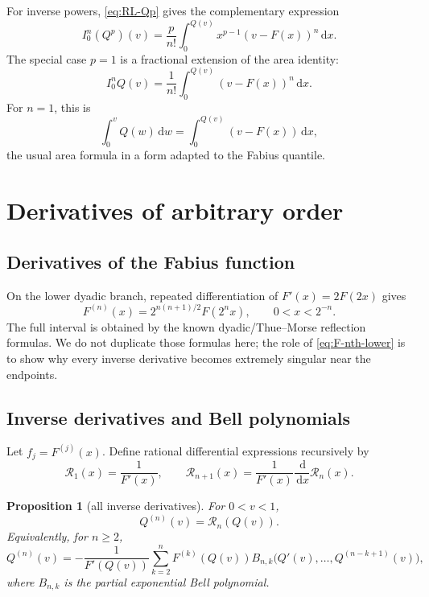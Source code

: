 \documentclass[11pt,oneside]{article}
\newtheorem{proposition}[theorem]{Proposition}
\theoremstyle{definition}
\newcommand{\F}{F}
\newcommand{\Q}{Q}
\newcommand{\dd}{\,\mathrm d}
\begin{document}
For inverse powers, \cref{eq:RL-Qp} gives the complementary expression
\begin{equation}\label{eq:nth-Q-primitive}
 I_0^n(\Q^p)(v)
 =\frac{p}{n!}\int_0^{\Q(v)}x^{p-1}(v-\F(x))^n\dd x.
\end{equation}
The special case \(p=1\) is a fractional extension of the area identity:
\begin{equation}\label{eq:nth-Q-area}
 I_0^n\Q(v)=\frac1{n!}\int_0^{\Q(v)}(v-\F(x))^n\dd x.
\end{equation}
For \(n=1\), this is
\begin{equation}\label{eq:classic-inverse-area}
 \int_0^v\Q(w)\dd w=\int_0^{\Q(v)}(v-\F(x))\dd x,
\end{equation}
the usual area formula in a form adapted to the Fabius quantile.

\section{Derivatives of arbitrary order}

\subsection{Derivatives of the Fabius function}

On the lower dyadic branch, repeated differentiation of
\(\F'(x)=2\F(2x)\) gives
\begin{equation}\label{eq:F-nth-lower}
 \F^{(n)}(x)=2^{n(n+1)/2}\F(2^nx),
 \qquad 0<x<2^{-n}.
\end{equation}
The full interval is obtained by the known dyadic/Thue--Morse reflection formulas.
We do not duplicate those formulas here; the role of \cref{eq:F-nth-lower} is to show
why every inverse derivative becomes extremely singular near the endpoints.

\subsection{Inverse derivatives and Bell polynomials}

Let \(f_j=\F^{(j)}(x)\).  Define rational differential expressions recursively by
\begin{equation}\label{eq:Rinverse-rec}
 \mathcal R_1(x)=\frac1{\F'(x)},
 \qquad
 \mathcal R_{n+1}(x)=\frac1{\F'(x)}\frac{\dd}{\dd x}\mathcal R_n(x).
\end{equation}

\begin{proposition}[all inverse derivatives]\label{prop:inverse-derivatives}
For \(0<v<1\),
\begin{equation}\label{eq:Q-nth-operator}
 \Q^{(n)}(v)=\mathcal R_n(\Q(v)).
\end{equation}
Equivalently, for \(n\ge2\),
\begin{equation}\label{eq:Q-Bell-rec}
 \Q^{(n)}(v)
 =-\frac1{\F'(\Q(v))}
 \sum_{k=2}^n\F^{(k)}(\Q(v))
 B_{n,k}\bigl(\Q'(v),\ldots,\Q^{(n-k+1)}(v)\bigr),
\end{equation}
where \(B_{n,k}\) is the partial exponential Bell polynomial.
\end{proposition}
\end{document}
